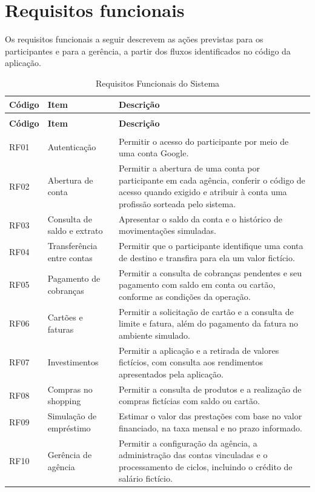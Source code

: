 \section{Requisitos funcionais}
\label{cap-concepcao-requisitos-funcionais}

Os requisitos funcionais a seguir descrevem as ações previstas
para os participantes e para a gerência, a partir dos fluxos
identificados no código da aplicação.

\renewcommand{\arraystretch}{1.4}

\begin{xltabular}{\textwidth}{|>{\centering\arraybackslash}m{1.6cm}|>{\centering\arraybackslash}m{3.6cm}|X|}
\caption{Requisitos Funcionais do Sistema}\label{tab:requisitos-funcionais}\\
\hline
\textbf{Código} & \textbf{Item} & \textbf{Descrição} \\
\hline
\endfirsthead
{}\\
\hline
\textbf{Código} & \textbf{Item} & \textbf{Descrição} \\
\hline
\endhead
\hline
{}\\
\endfoot
\hline
\endlastfoot

RF01 & Autenticação & Permitir o acesso do participante por meio de uma conta Google. \\
\hline
RF02 & Abertura de conta & Permitir a abertura de uma conta por participante em cada agência, conferir o código de acesso quando exigido e atribuir à conta uma profissão sorteada pelo sistema. \\
\hline
RF03 & Consulta de saldo e extrato & Apresentar o saldo da conta e o histórico de movimentações simuladas. \\
\hline
RF04 & Transferência entre contas & Permitir que o participante identifique uma conta de destino e transfira para ela um valor fictício. \\
\hline
RF05 & Pagamento de cobranças & Permitir a consulta de cobranças pendentes e seu pagamento com saldo em conta ou cartão, conforme as condições da operação. \\
\hline
RF06 & Cartões e faturas & Permitir a solicitação de cartão e a consulta de limite e fatura, além do pagamento da fatura no ambiente simulado. \\
\hline
RF07 & Investimentos & Permitir a aplicação e a retirada de valores fictícios, com consulta aos rendimentos apresentados pela aplicação. \\
\hline
RF08 & Compras no shopping & Permitir a consulta de produtos e a realização de compras fictícias com saldo ou cartão. \\
\hline
RF09 & Simulação de empréstimo & Estimar o valor das prestações com base no valor financiado, na taxa mensal e no prazo informado. \\
\hline
RF10 & Gerência de agência & Permitir a configuração da agência, a administração das contas vinculadas e o processamento de ciclos, incluindo o crédito de salário fictício. \\
\hline


\end{xltabular}
